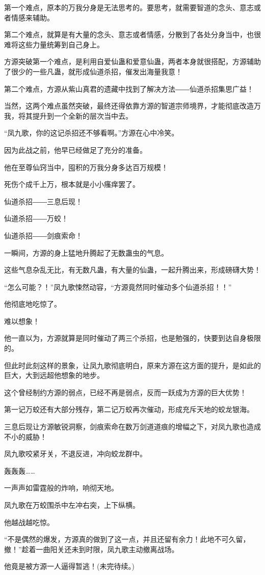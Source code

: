 \begin{this_body}
第一个难点，原本的万我分身是无法思考的。要思考，就需要智道的念头、意志或者情感来辅助。

第二个难点，就算是有大量的念头、意志或者情感，分散到了各处分身当中，也很难将这些力量统筹到自己身上。

方源突破第一个难点，是利用自爱仙蛊和爱意仙蛊，两者本身就很搭配，方源辅助了很少的一些凡蛊，就形成仙道杀招，催发出海量我意！

第二个难点，方源从紫山真君的遗藏中找到了解决方法――仙道杀招集思广益！

当然，这两个难点虽然突破，最终还得依靠方源的智道宗师境界，才能彻底改造万我，将其提升到一个全新的层次当中去。

“凤九歌，你的这记杀招还不够看啊。”方源在心中冷笑。

因为此战之前，他早已经做足了充分的准备。

他在至尊仙窍当中，囤积的万我分身多达百万规模！

死伤个成千上万，根本就是小小瘙痒罢了。

仙道杀招――三息后现！

仙道杀招――万蛟！

仙道杀招――剑痕索命！

一瞬间，方源的身上猛地升腾起了无数蛊虫的气息。

这些气息杂乱无比，有无数凡蛊，有大量的仙蛊，一起升腾出来，形成磅礴大势！

“怎么可能？！”凤九歌悚然动容，“方源竟然同时催动多个仙道杀招！！”

他彻底地吃惊了。

难以想象！

他一直以为，方源就算是同时催动了两三个杀招，也是勉强的，快要到达自身极限的。

但此时此刻这样的景象，让凤九歌彻底明白，原来方源在这方面的提升，是如此的巨大，大到远超他想象的地步。

这个曾经制约方源的弱点，已经不再是弱点，反而一跃成为方源的巨大优势！

第一记万蛟还有大部分残存，第二记万蛟再次催动，形成充斥天地的蛟龙银海。

三息后现让方源敏锐洞察，剑痕索命在数万剑道道痕的增幅之下，对凤九歌也造成不小的威胁！

凤九歌咬紧牙关，不退反进，冲向蛟龙群中。

轰轰轰……

一声声如雷霆般的炸响，响彻天地。

凤九歌在万蛟围杀中左冲右突，上下纵横。

他越战越吃惊。

“不是偶然的爆发，方源真的做到了这一点，并且还留有余力！此地不可久留，撤！”趁着一曲阳关还未到时限，凤九歌主动撤离战场。

他竟是被方源一人逼得暂逃！(未完待续。)

\end{this_body}

